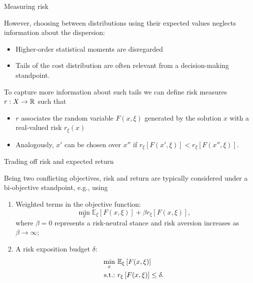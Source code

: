 \begin{frame}{Measuring risk}

	However, choosing between distributions using their expected values neglects \alert{information about the dispersion}:
	\begin{itemize}
		\item Higher-order statistical moments are disregarded
		\item \alert{Tails} of the cost distribution are often relevant from a decision-making standpoint.	
	\end{itemize}
	
	\pause
	To capture more information about such tails we can define \alert{risk measures} $r : X \to \mathbb R$ such that
		\begin{itemize}
			\item $r$ associates the random variable $F(x, \xi)$ generated by the solution $x$ with a \alert{real-valued risk} $r_\xi(x)$
			\item Analogously, $x'$ can be chosen over $x''$ if $r_\xi\left[F(x', \xi)\right] < r_\xi\left[F(x'', \xi)\right]$.
		\end{itemize}
	
\end{frame}


\begin{frame}{Trading off risk and expected return}

	Being \alert{two conflicting objectives}, risk and return are typically considered under a bi-objective standpoint, e.g., using
	\begin{enumerate}[<+->]
		\item \alert{Weighted terms} in the objective function:
		\begin{equation*}	
				\min_x  \mathbb{E}_\xi\left[F(x,\xi)\right] + \beta r_\xi\left[F(x, \xi)\right],
		\end{equation*}
		where $\beta = 0$ represents a risk-neutral stance and risk aversion increases as $\beta \to \infty$;
		\item A \alert{risk exposition budget} $\delta$:
		\begin{align*}	
				\min_x~ & \mathbb{E}_\xi\left[F(x,\xi)\right] \\
				\mathop{\text{s.t.:} \ } & r_\xi\left[F(x, \xi)\right] \le \delta. 
		\end{align*}
	\end{enumerate}
		
\end{frame}


